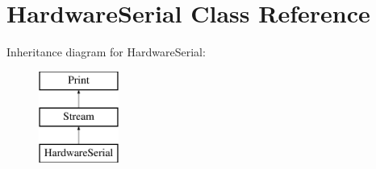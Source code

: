 \hypertarget{class_hardware_serial}{}\section{Hardware\+Serial Class Reference}
\label{class_hardware_serial}
Inheritance diagram for Hardware\+Serial\+:\begin{figure}[H]
\begin{center}
\leavevmode
\includegraphics[height=3.000000cm]{class_hardware_serial}
\end{center}
\end{figure}
